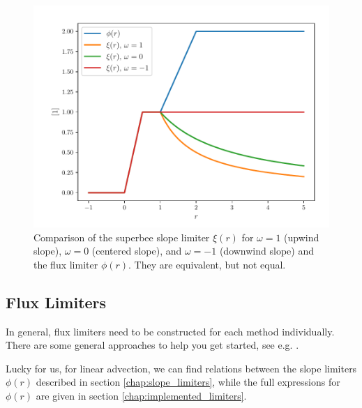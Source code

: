 \begin{figure}[H]
	\centering
	\includegraphics[width=.9\textwidth]{./figures/superbee-xi-vs-phi.pdf}%
	\caption{
		\label{fig:superbee-xi-vs-phi}
		Comparison of the superbee slope limiter $\xi(r)$ for $\omega = 1$ (upwind slope), $\omega = 0$ (centered slope), and $\omega = -1$ (downwind slope) and the flux limiter $\phi(r)$.
		They are equivalent, but not equal.
	}
\end{figure}














\subsection{Flux Limiters}




In general, flux limiters need to be constructed for each method individually.
There are some general approaches to help you get started, see e.g. \cite{toro}.

Lucky for us, for linear advection, we can find relations between the slope limiters $\phi(r)$ described in section \ref{chap:slope_limiters}, while the full expressions for $\phi(r)$ are given in section \ref{chap:implemented_limiters}.






